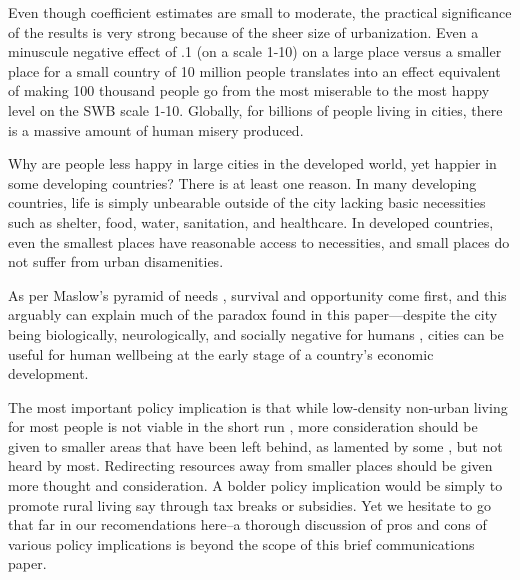 \documentclass[11pt, letterpaper]{article}
\begin{document}
Even though coefficient estimates are small to moderate, the practical significance
of the results is very strong because of the sheer size of urbanization. 
%
Even a minuscule negative effect of .1 (on a scale 1-10) on a large place versus a smaller place for a small country of 10 million people translates into an effect equivalent of making 100 thousand people go from the most miserable to the most happy level on the SWB scale 1-10. %
 Globally, for billions of people living in cities, there is a massive amount of
 human misery produced. 

Why are people less happy in large cities in the developed world, yet happier in some
developing countries? There is at least one reason. In many developing
countries, life is simply unbearable outside of the city lacking basic
necessities such as shelter, food, water, sanitation, and healthcare. In
developed countries, even the smallest places have reasonable access to
necessities, and small places do not suffer from urban disamenities. %
 
As per Maslow's pyramid of needs \citep{maslow87}, survival and opportunity
come first, and this arguably can explain much of the paradox found in this
paper---despite the city being biologically, neurologically, and socially negative
for humans \cite{wirth38,simmel03,lederbogen11}, cities can be useful for human wellbeing at the early stage of a
country's economic development. 

The most important policy implication is that while low-density non-urban living
for most people is not viable in the short run \citep[e.g.,][]{meyer13},  more consideration should be given to smaller areas that have been left behind, as lamented by some \citep[e.g.,][]{fullerNYT17monD,hansonCityJournalautumn15}, but not heard by most. Redirecting resources away from smaller places should be given more thought and consideration.
 A bolder policy implication would be simply to promote rural living say through tax breaks or
 subsidies. Yet we hesitate to go that far in our recomendations here--a
 thorough discussion of pros and cons of various policy implications is beyond the scope of this brief communications paper. 
\end{document}
